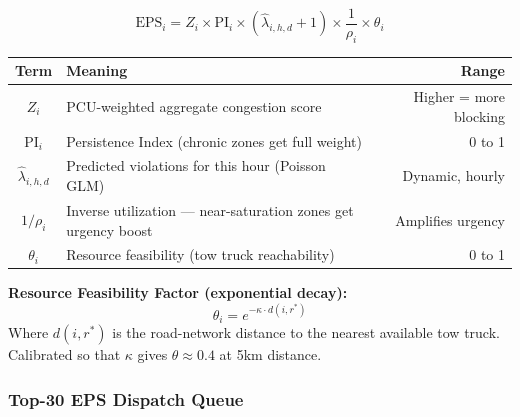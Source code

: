 \documentclass[12pt,a4paper]{article}
\begin{document}
\begin{tcolorbox}[formulabox]
\begin{equation}
    \text{EPS}_i = Z_i \times \text{PI}_i \times (\hat{\lambda}_{i,h,d} + 1) \times \frac{1}{\rho_i} \times \theta_i
    \label{eq:eps}
\end{equation}

\begin{table}[H]
\centering
\begin{tabular}{clr}
\toprule
\textbf{Term} & \textbf{Meaning} & \textbf{Range} \\
\midrule
$Z_i$ & PCU-weighted aggregate congestion score & Higher = more blocking \\
$\text{PI}_i$ & Persistence Index (chronic zones get full weight) & 0 to 1 \\
$\hat{\lambda}_{i,h,d}$ & Predicted violations for this hour (Poisson GLM) & Dynamic, hourly \\
$1/\rho_i$ & Inverse utilization — near-saturation zones get urgency boost & Amplifies urgency \\
$\theta_i$ & Resource feasibility (tow truck reachability) & 0 to 1 \\
\bottomrule
\end{tabular}
\end{table}

\noindent\textbf{Resource Feasibility Factor (exponential decay):}
\begin{equation}
    \theta_i = e^{-\kappa \cdot d(i, r^*)}
\end{equation}
Where $d(i, r^*)$ is the road-network distance to the nearest available tow truck. Calibrated so that $\kappa$ gives $\theta \approx 0.4$ at 5km distance.
\end{tcolorbox}

\subsubsection{Top-30 EPS Dispatch Queue}
\end{document}
